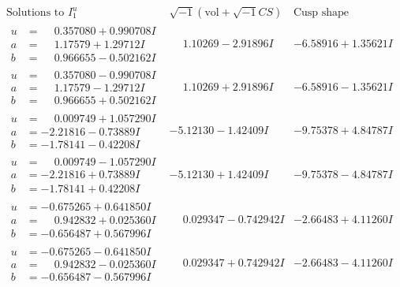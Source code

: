 \documentclass[1p]{elsarticle_modified}
\theoremstyle{definition}
\newcommand{\I}{\sqrt{-1}}
\begin{document}
$$\begin{array}{c|c|c}  
\text{Solutions to }I^u_{1}& \I (\text{vol} + \sqrt{-1}CS) & \text{Cusp shape}\\
 \hline 
\begin{aligned}
u &= \phantom{-}0.357080 + 0.990708 I \\
a &= \phantom{-}1.17579 + 1.29712 I \\
b &= \phantom{-}0.966655 - 0.502162 I\end{aligned}
 & \phantom{-}1.10269 - 2.91896 I & -6.58916 + 1.35621 I \\ \hline\begin{aligned}
u &= \phantom{-}0.357080 - 0.990708 I \\
a &= \phantom{-}1.17579 - 1.29712 I \\
b &= \phantom{-}0.966655 + 0.502162 I\end{aligned}
 & \phantom{-}1.10269 + 2.91896 I & -6.58916 - 1.35621 I \\ \hline\begin{aligned}
u &= \phantom{-}0.009749 + 1.057290 I \\
a &= -2.21816 - 0.73889 I \\
b &= -1.78141 - 0.42208 I\end{aligned}
 & -5.12130 - 1.42409 I & -9.75378 + 4.84787 I \\ \hline\begin{aligned}
u &= \phantom{-}0.009749 - 1.057290 I \\
a &= -2.21816 + 0.73889 I \\
b &= -1.78141 + 0.42208 I\end{aligned}
 & -5.12130 + 1.42409 I & -9.75378 - 4.84787 I \\ \hline\begin{aligned}
u &= -0.675265 + 0.641850 I \\
a &= \phantom{-}0.942832 + 0.025360 I \\
b &= -0.656487 + 0.567996 I\end{aligned}
 & \phantom{-}0.029347 - 0.742942 I & -2.66483 + 4.11260 I \\ \hline\begin{aligned}
u &= -0.675265 - 0.641850 I \\
a &= \phantom{-}0.942832 - 0.025360 I \\
b &= -0.656487 - 0.567996 I\end{aligned}
 & \phantom{-}0.029347 + 0.742942 I & -2.66483 - 4.11260 I \\ \hline\begin{aligned}

\end{aligned}
\end{array}$$
\end{document}
